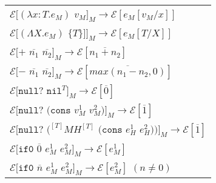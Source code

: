 \begin{figure}[p]
\centering
\begin{tabular}{l}
\vspace{5pt}

$\mathscr{E}[(\lambda x:T.e_{M})$ $v_{M}]_{M}\rightarrow\mathscr{E}[e_{M}[v_{M}/x]]$ \\

\vspace{5pt}

$\mathscr{E}[(\Lambda X.e_{M})$ $\lbrace T\rbrace]]_{M}\rightarrow\mathscr{E}[e_{M}[T/X]]$ \\

\vspace{5pt}

$\mathscr{E}[+$ $\overline{n_{1}}$ $\overline{n_{2}}]_{M}\rightarrow\mathscr{E}[\overline{n_{1}+n_{2}}]$ \\

\vspace{5pt}

$\mathscr{E}[-$ $\overline{n_{1}}$ $\overline{n_{2}}]_{M}\rightarrow\mathscr{E}[\overline{max(n_{1}-n_{2},0)}]$ \\

\vspace{5pt}

$\mathscr{E}[\mathtt{null?}$ $\mathtt{nil}^{T}]_{M}\rightarrow\mathscr{E}[\overline{0}]$ \\

\vspace{5pt}

$\mathscr{E}[\mathtt{null?}$ $(\mathtt{cons}$ $v_{M}^{1}$ $v_{M}^{2})]_{M}\rightarrow\mathscr{E}[\overline{1}]$ \\

\vspace{5pt}

$\mathscr{E}[\mathtt{null?}$ $(^{[T]}MH^{[T]}$ $(\mathtt{cons}$ $e_{H}^{1}$ $e_{H}^{2}))]_{M}\rightarrow\mathscr{E}[\overline{1}]$ \\

\vspace{5pt}

$\mathscr{E}[\mathtt{if0}$ $\overline{0}$ $e_{M}^{1}$ $e_{M}^{2}]_{M}\rightarrow\mathscr{E}[e_{M}^{1}]$ \\

\vspace{5pt}

$\mathscr{E}[\mathtt{if0}$ $\overline{n}$ $e_{M}^{1}$ $e_{M}^{2}]_{M}\rightarrow\mathscr{E}[e_{M}^{2}]$ $(n\neq0)$ \\


\end{tabular}
\end{figure}
